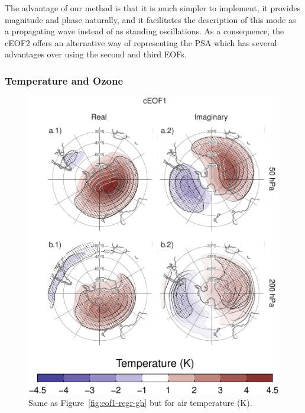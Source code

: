 \documentclass[smallextended]{svjour3}       %
\begin{document}
The advantage of our method is that it is much simpler to implement, it provides magnitude and phase naturally, and it facilitates the description of this mode as a propagating wave instead of as standing oscillations.
As a consequence, the cEOF2 offers an alternative way of representing the PSA which has several advantages over using the second and third EOFs.

\hypertarget{temperature-and-ozone}{%
\subsubsection{Temperature and Ozone}\label{temperature-and-ozone}}



\begin{figure}
\centering
\includegraphics{../figures/eof1-regr-t-1.pdf}
\caption{\label{fig:eof1-regr-t}Same as Figure~\ref{fig:eof1-regr-gh} but for air temperature (K).}
\end{figure}
\end{document}
